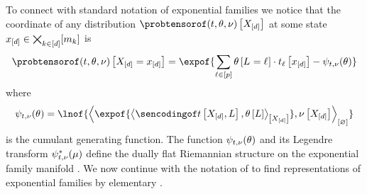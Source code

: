 To connect with standard notation of exponential families we notice that the coordinate of any distribution $\expdistat{\shortcatvariables}$ at some state $x_{[d]}\in\bigtimes_{k\in[d]}[m_{k}]$ is
\begin{align*}
    \expdistat{\indexedshortcatvariables}
    = \expof{\sum_{\selindexin}\weightparamat{\indexedselvariable}\cdot\sstatcoordinateofat{\selindex}{\shortcatindices} - \psi_{\sstat,\basemeasure}(\weightparam)}
\end{align*}
where
\begin{align*}
    \psi_{\sstat,\basemeasure}(\weightparam)
    = \lnof{\contraction{\expof{\contractionof{\sencsstatat{\shortcatvariables,\selvariable},\canparamwith}{\shortcatvariables}},\basemeasurewith}}
\end{align*}
is the cumulant generating function.
The function $\psi_{t,\nu}(\theta)$ and its Legendre transform $\psi^*_{t,\nu}(\mu)$ define the dually flat Riemannian structure on the exponential family manifold \cite{amari_information_2016}.
%
We now continue with the notation of  to find representations of exponential families by elementary \ComputationActivationNetworks{}.


